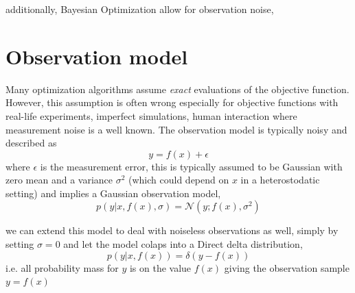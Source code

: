 additionally, Bayesian Optimization allow for observation noise, 

\section{Observation model}\label{ObsModel}
Many optimization algorithms assume \textit{exact} evaluations of the objective function. However, this assumption
is often wrong especially for objective functions with real-life experiments, imperfect simulations, human interaction 
where measurement noise is a well known. The observation model is typically noisy and described as
$$y = f(x)+\epsilon$$ where $\epsilon$ is the measurement error, this is
typically assumed to be Gaussian with zero mean and a variance
$\sigma^2$ (which could depend on $x$ in a heterostodatic setting) and implies a Gaussian observation model, 
$$p(y|x,f(x),\sigma) = \mathcal{N}(y;f(x),\sigma^2)$$ 

we can extend this model to deal with noiseless observations as well, simply by setting $\sigma = 0$ and let the
model colaps into a Direct delta distribution, 
$$p(y|x, f(x)) = \mathcal{\delta}(y-f(x))$$
i.e. all probability mass for $y$ is on the value $f(x)$ giving the observation sample $y = f(x)$


